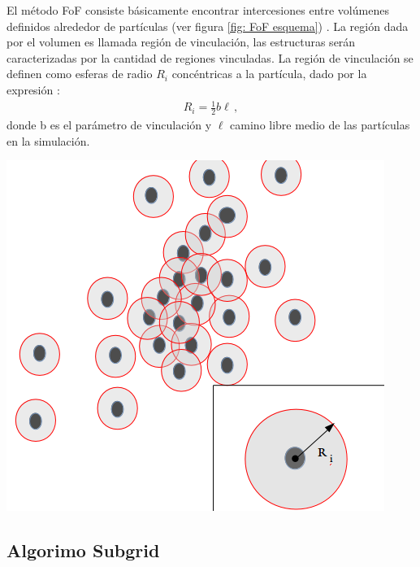 El método FoF consiste básicamente encontrar intercesiones entre volúmenes definidos alrededor de partículas (ver figura  \ref{fig: FoF esquema}) . La región dada por el volumen es llamada región de vinculación, las estructuras serán caracterizadas por la cantidad de regiones vinculadas. La región de vinculación se definen como esferas de radio $R_{i}$ concéntricas a la partícula, dado por la expresión \cite{bustamente01}:
%
\begin{align}
    R_{i}=\frac{1}{2}b\ell\,,
\end{align}
%
donde b es el parámetro de vinculación y $\ell$ camino libre medio de las partículas en la simulación. 
%
\begin{center}
\includegraphics[scale=.35]{./figures/5_Algoritmo_Modelacion/FoF_metodo.png}
\label{fig: FoF esquema}
\end{center}
%

    \subsection{Algorimo Subgrid}
    \label{subsec: Algoritmo subgrid}

